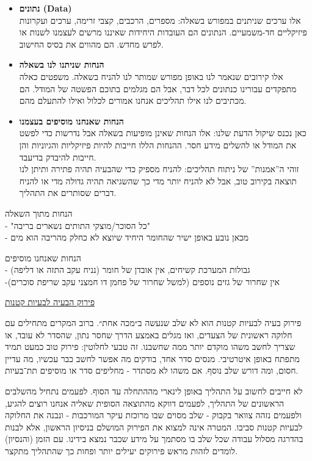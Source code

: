\documentclass[
  hebrew,
  letterpaper,
  DIV=11,
  numbers=noendperiod]{scrreprt}
\begin{document}
\begin{itemize}
\item
  \textbf{נתונים (Data)}\\
  אלו ערכים שניתנים במפורש בשאלה: מספרים, הרכבים, קצבי זרימה, ערכים
  ועקרונות פיזיקליים חד-משמעיים. הנתונים הם העובדות היחידות שאיננו מרשים
  לעצמנו לשנות או לפרש מחדש. הם מהווים את בסיס החישוב.
\item
  \textbf{הנחות שניתנו לנו בשאלה}\\
  אלו קירובים שנאמר לנו באופן מפורש שמותר לנו להניח בשאלה. משפטים כאלה
  מתפקדים עבורינו כנתונים לכל דבר, אבל הם מגלמים בתוכם הפשטה של המודל.
  הם מכתיבים לנו אילו תהליכים אנחנו אמורים לכלול ואילו להתעלם מהם.
\item
  \textbf{הנחות שאנחנו מוסיפים בעצמנו}\\
  כאן נכנס שיקול הדעת שלנו: אלו הנחות שאינן מופיעות בשאלה אבל נדרשות כדי
  לפשט את המודל או להשלים מידע חסר. ההנחות הללו חייבות להיות פיזיקליות
  והגיוניות והן חייבות להיבדק בדיעבד.\\
  זוהי ה''אמנות'' של ניתוח תהליכים: להניח מספיק כדי שהבעיה תהיה פתירה
  ותיתן לנו תוצאה בקירוב טוב, אבל לא להניח יותר מדי כך שהשגיאה תהיה
  גדולה מדי או להניח דברים שסותרים את התהליך.
\end{itemize}

הנחות מתוך השאלה\\
- "כל הסוכר/מוצקי התותים נשארים בריבה"\\
- מכאן נובע באופן ישיר שהחומר היחיד שיוצא לא כחלק מהריבה הוא מים

הנחות שאנחנו מוסיפים\\
- גבולות המערכת קשיחים, אין אובדן של חומר (נניח עקב התזה או דליפה)\\
-אין שחרור של גזים נוספים (למשל שחרור של פחמן דו חמצני עקב שריפת סוכרים)

\ul{פירוק הבעיה לבעיות קטנות}

פירוק בעיה לבעיות קטנות הוא לא שלב שנעשה ב״מכה אחת״. ברוב המקרים מתחילים
עם חלוקה ראשונית של הצעדים, ואז מגלים באמצע הדרך שחסר נתון, שהסדר לא
עובד, או שצריך לחשב משהו מוקדם יותר ממה שחשבנו. זה טבעי לחלוטין: פירוק
טוב כמעט תמיד מתפתח באופן איטרטיבי. מנסים סדר אחד, בודקים מה אפשר לחשב
כבר עכשיו, מה עדיין חסום, ומה דורש שלב נוסף. אם משהו לא מסתדר - מחליפים
סדר או מוסיפים תת־בעיות.

לא חייבים לחשוב על התהליך באופן לינארי מההתחלה עד הסוף. לפעמים נתחיל
מהשלבים הראשונים של התהליך, לפעמים דווקא מהתוצאה הסופית שאליה אנחנו
רוצים להגיע, ולפעמים נזהה צוואר בקבוק - שלב מסוים שבו מרוכזת עיקר
המורכבות - ונבנה את החלוקה לבעיות קטנות סביבו. המטרה אינה למצוא את
הפירוק המושלם בניסיון הראשון, אלא לבנות בהדרגה מסלול עבודה שכל שלב בו
מסתמך על מידע שכבר נמצא בידינו. עם הזמן (והנסיון) לומדים לזהות מראש
פירוקים יעילים יותר ופחות כך שהתהליך מתקצר.
\end{document}
